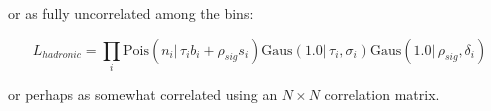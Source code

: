 or as fully uncorrelated among the bins:

\begin{equation}
L_{hadronic}=\prod_i \mathrm{Pois}(n_i |\, \tau_i b_i + \rho_{sig}s_i)\mathrm{Gaus}(1.0 |\,\tau_i, \sigma_i)\mathrm{Gaus}(1.0 |\,\rho_{sig}, \delta_{i})
\end{equation}

or perhaps as somewhat correlated using an $N \times N$ correlation matrix.

